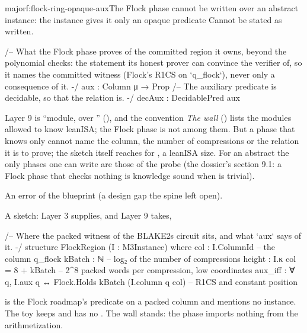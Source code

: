 \begin{finding}{major}{f:flock-ring-opaque-aux}{The Flock phase cannot be written over an abstract
instance: the instance gives it only an opaque predicate}
 Cannot be stated as written.
\begin{leancode}
  /-- What the Flock phase proves of the committed region it owns, beyond the polynomial
  checks: the statement its honest prover can convince the verifier of, so it names the
  committed witness (Flock's R1CS on `q_flock`), never only a consequence of it. -/
  aux : Column μ → Prop
  /-- The auxiliary predicate is decidable, so that the relation is. -/
  decAux : DecidablePred aux
\end{leancode}
Layer 9 is \enquote{module, over } (), and the convention \emph{The wall}
() lists the modules allowed to know leanISA; the Flock phase is not among them. But
a phase that knows only  cannot name the column, the number of
compressions or the relation it is to prove; the sketch itself reaches for , a
leanISA size. For an abstract  the only phases one can write are those of the probe (the
dossier's section 9.1: a Flock phase that checks nothing is knowledge sound when  is
trivial).

 An error of the blueprint (a design gap the spine left open).

 A sketch: Layer 3 supplies, and Layer 9 takes,
\begin{leancode}
/-- Where the packed witness of the BLAKE2s circuit sits, and what `aux` says of it. -/
structure FlockRegion (I : M3Instance) where
  col : I.ColumnId                        -- the column q_flock
  kBatch : ℕ                              -- log₂ of the number of compressions
  height : I.κ col = 8 + kBatch           -- 2^8 packed words per compression, low coordinates
  aux_iff : ∀ q, I.aux q ↔ Flock.Holds kBatch (I.column q col)   -- R1CS and constant position
\end{leancode}
 is the Flock roadmap's predicate on a packed column and mentions no instance.
The toy keeps  and has no . The wall stands: the phase imports
nothing from the arithmetization.
\end{finding}

